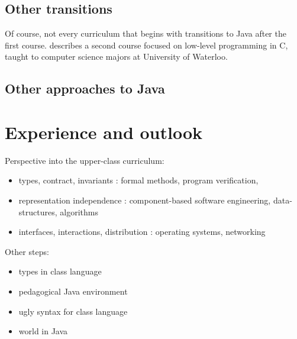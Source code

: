 \documentclass[submission,copyright]{eptcs}
\begin{document}
\subsection{Other transitions}

Of course, not every curriculum that begins with \htdp transitions to
Java after the first course.  \citet{dvanhorn:Ragde2008Chilling}
describes a second course focused on low-level programming in C,
taught to computer science majors at University of Waterloo.

\cite{dvanhorn:Chakravarty2004Risks}

\subsection{Other approaches to Java}

\cite{dvanhorn:Allen2002DrJava, dvanhorn:Hsia2005Taming}

\cite{dvanhorn:Kolling2003}

\cite{dvanhorn:Bruce2001Library}

\cite{dvanhorn:Alphonce2003Using}




\section{Experience and outlook}
\label{sec:conclusion}

Perspective into the upper-class curriculum:

\begin{itemize}
\item types, contract, invariants : formal methods, program verification,
  
\item representation independence : component-based software engineering,
  data-structures, algorithms

\item interfaces, interactions, distribution : operating systems, networking
\end{itemize}


Other steps:
\begin{itemize}
\item types in class language
\item pedagogical Java environment
\item ugly syntax for class language
\item world in Java
\end{itemize}
\end{document}
